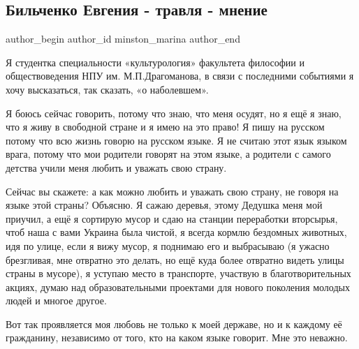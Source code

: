  
 
 
 
 
 
\subsection{Бильченко Евгения - травля - мнение}
\label{sec:27_01_2021.fb.minston_marina.1.mnenie_bilchenko_ucheba}
 
\ifcmt
 author_begin
   author_id minston_marina
 author_end
\fi

Я студентка специальности «культурология» факультета философии и
обществоведения НПУ им. М.П.Драгоманова, в связи с последними событиями я хочу
высказаться, так сказать, «о наболевшем». 

Я боюсь сейчас говорить, потому что знаю, что меня осудят, но я ещё я знаю, что
я живу в свободной стране и я имею на это право! Я пишу на русском потому что
всю жизнь говорю на русском языке. Я не считаю этот язык языком врага, потому
что мои родители говорят на этом языке, а родители с самого детства учили меня
любить и уважать свою страну. 

Сейчас вы скажете: а как можно любить и уважать свою страну, не говоря на языке
этой страны? Объясню. Я сажаю деревья, этому Дедушка меня мой приучил, а ещё я
сортирую мусор и сдаю на станции переработки вторсырья, чтоб наша с вами
Украина была чистой, я всегда кормлю бездомных животных, идя по улице, если я
вижу мусор, я поднимаю его и выбрасываю (я ужасно брезгливая, мне отвратно это
делать, но ещё куда более отвратно видеть улицы страны в мусоре), я уступаю
место в транспорте, участвую в благотворительных акциях, думаю над
образовательными проектами для нового поколения молодых людей и многое другое. 

Вот так проявляется моя любовь не только к моей державе, но и к каждому её
гражданину, независимо от того, кто на каком языке говорит. Мне это неважно. 

